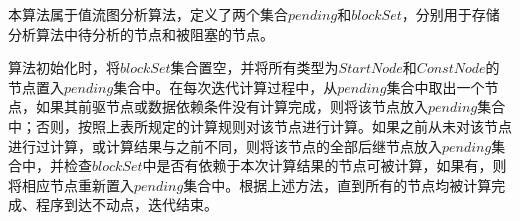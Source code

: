 %

本算法属于值流图分析算法，定义了两个集合$ pending $和$ blockSet $，分别用于存储分析算法中待分析的节点和被阻塞的节点。

算法初始化时，将$ blockSet $集合置空，并将所有类型为$ StartNode $和$ ConstNode $的节点置入$ pending $集合中。在每次迭代计算过程中，从$ pending $集合中取出一个节点，如果其前驱节点或数据依赖条件没有计算完成，则将该节点放入$ pending $集合中；否则，按照上表所规定的计算规则对该节点进行计算。如果之前从未对该节点进行过计算，或计算结果与之前不同，则将该节点的全部后继节点放入$ pending $集合中，并检查$ blockSet $中是否有依赖于本次计算结果的节点可被计算，如果有，则将相应节点重新置入$ pending $集合中。根据上述方法，直到所有的节点均被计算完成、程序到达不动点，迭代结束。

